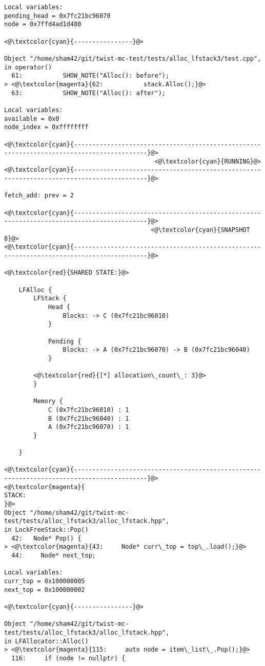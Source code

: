 \begin{adjustwidth}{-3.3cm}{-1cm}
\begin{allintypewriter}
\begin{multicols*}{2}
\begin{lstlisting}[numbers=none]
Local variables: 
pending_head = 0x7fc21bc96070
node = 0x7ffd4ad1d480

<@\textcolor{cyan}{----------------}@>

Object "/home/sham42/git/twist-mc-test/tests/alloc_lfstack3/test.cpp",
in operator()
  61:           SHOW_NOTE("Alloc(): before");
> <@\textcolor{magenta}{62:           stack.Alloc();}@>
  63:           SHOW_NOTE("Alloc(): after");

Local variables: 
available = 0x0
node_index = 0xffffffff

<@\textcolor{cyan}{------------------------------------------------------------------------------------------}@>
                                         <@\textcolor{cyan}{RUNNING}@>
<@\textcolor{cyan}{------------------------------------------------------------------------------------------}@>

fetch_add: prev = 2

<@\textcolor{cyan}{------------------------------------------------------------------------------------------}@>
                                        <@\textcolor{cyan}{SNAPSHOT 8}@>
<@\textcolor{cyan}{------------------------------------------------------------------------------------------}@>

<@\textcolor{red}{SHARED STATE:}@>

    LFAlloc {
	    LFStack {
		    Head {
			    Blocks: -> C (0x7fc21bc96010) 
		    }

		    Pending {
			    Blocks: -> A (0x7fc21bc96070) -> B (0x7fc21bc96040) 
		    }

		<@\textcolor{red}{[*] allocation\_count\_: 3}@>
	    }

	    Memory {
		    C (0x7fc21bc96010) : 1
		    B (0x7fc21bc96040) : 1
		    A (0x7fc21bc96070) : 1
	    }

    }

<@\textcolor{cyan}{------------------------------------------------------------------------------------------}@>
<@\textcolor{magenta}{
STACK:
}@>
Object "/home/sham42/git/twist-mc-test/tests/alloc_lfstack3/alloc_lfstack.hpp",
in LockFreeStack::Pop()
  42:   Node* Pop() {
> <@\textcolor{magenta}{43:     Node* curr\_top = top\_.load();}@>
  44:     Node* next_top;

Local variables: 
curr_top = 0x100000005
next_top = 0x100000002

<@\textcolor{cyan}{----------------}@>

Object "/home/sham42/git/twist-mc-test/tests/alloc_lfstack3/alloc_lfstack.hpp",
in LFAllocator::Alloc()
> <@\textcolor{magenta}{115:     auto node = item\_list\_.Pop();}@>
  116:     if (node != nullptr) {


\end{lstlisting}
\end{multicols*}
\end{allintypewriter}
\end{adjustwidth}
